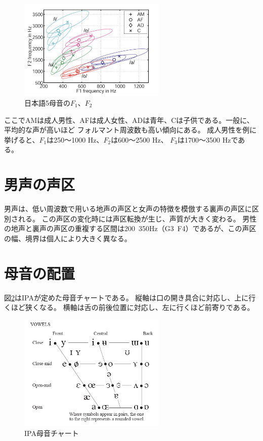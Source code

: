 \documentclass[10.5ptj,a4j,dvipdfmx,uplatex, oneside, openany]{jsbook}%
\begin{document}
\begin{figure}[htbp]
    \begin{center}
      \includegraphics[clip,width=7.0cm]{5母音.png}
      \caption{日本語5母音の$F_1$、$F_2$\cite{japanese_vowels}}
      \label{jp_formant}
    \end{center}
\end{figure}
ここでAMは成人男性、AFは成人女性、ADは青年、Cは子供である。一般に、平均的な声が高いほど
フォルマント周波数も高い傾向にある。
成人男性を例に挙げると、$F_1$は250〜1000 \si{Hz}、$F_2$は600〜2500 \si{Hz}、
$F_3$は1700〜3500 \si{Hz}である\cite{science}。


\section{男声の声区}
男声は、低い周波数で用いる地声の声区と女声の特徴を模倣する裏声の声区に区別される。\cite{science}
この声区の変化時には声区転換が生じ、声質が大きく変わる。
男性の地声と裏声の声区の重複する区間は200~350Hz（G3~F4）であるが、この声区の幅、境界は個人により大きく異なる。

\section{母音の配置}
図\ref{vowels}はIPAが定めた母音チャートである。
縦軸は口の開き具合に対応し、上に行くほど狭くなる。
横軸は舌の前後位置に対応し、左に行くほど前寄りである。

\begin{figure}[htbp]
    \begin{center}
      \includegraphics[clip,width=7.0cm]{vowels.png}
      \caption{IPA母音チャート\cite{vowels}}
      \label{vowels}
    \end{center}
\end{figure}
\end{document}
